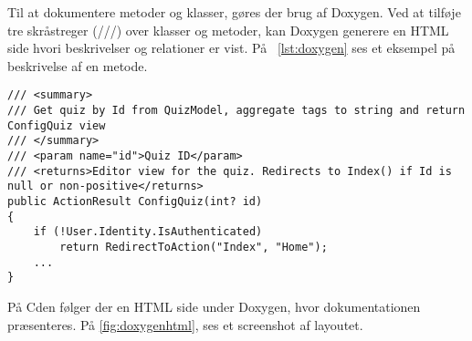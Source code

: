 Til at dokumentere metoder og klasser, gøres der brug af Doxygen. Ved at tilføje tre skråstreger (///) over klasser og metoder, kan Doxygen generere en HTML side hvori beskrivelser og relationer er vist.
På \lstlistingname\ \ref{lst:doxygen} ses et eksempel på beskrivelse af en metode.

\begin{lstlisting}[caption=Eksempel på Doxygen notation, label=lst:doxygen]
/// <summary>
/// Get quiz by Id from QuizModel, aggregate tags to string and return ConfigQuiz view
/// </summary>
/// <param name="id">Quiz ID</param>
/// <returns>Editor view for the quiz. Redirects to Index() if Id is null or non-positive</returns>
public ActionResult ConfigQuiz(int? id)
{
	if (!User.Identity.IsAuthenticated)
		return RedirectToAction("Index", "Home");
	...
}
\end{lstlisting}

På Cden følger der en HTML side under Doxygen, hvor dokumentationen præsenteres. På \ref{fig:doxygenhtml}, ses et screenshot af layoutet.

